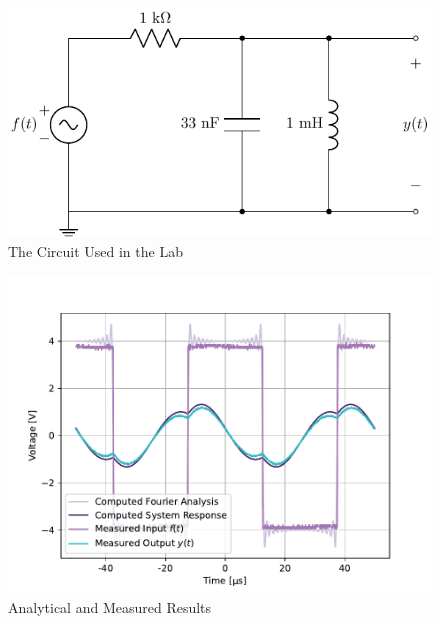 \documentclass[11pt]{texMemo-gibbons}
\begin{document}
\clearpage

\begin{figure}[h!]
  \centering
  \includegraphics[width=0.7\linewidth]{circuits/circuit_01.pdf}
  \caption{The Circuit Used in the Lab}
  \label{fig:circuit}
\end{figure}

\begin{figure}[h!]
  \centering
  \includegraphics[width=0.7\linewidth]{plots/fourier_analysis.pdf}
  \caption{Analytical and Measured Results}
  \label{fig:plot}
\end{figure}
\end{document}
